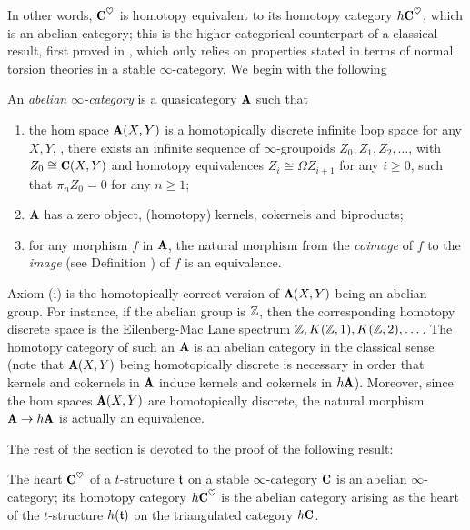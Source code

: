 \documentclass[a4paper,12pt]{amsart}
\renewcommand{\textbf}[1]{\text{\fontseries{b}\selectfont{\upshape #1}}}
\begin{document}
In other words, $\C^\heart$ is homotopy equivalent to its homotopy category $h\C^\heart$, which is an abelian category; this is the higher-categorical counterpart of a classical result, first proved in \cite[Thm. \textbf{1.3.6}]{BBDPervers}, 
which 
only relies on properties stated in terms of normal torsion theories in a stable $\infty$-category. We begin with the following
\begin{definition}\label{df:abelinfty}
An \emph{abelian $\infty$-category} is a quasicategory $\cate{A}$ such that
\begin{enumerate}
\item the hom space $\cate{A}(X,Y)$ is a homotopically discrete infinite loop space for any $X, Y$, \ie, there exists an infinite sequence of $\infty$-groupoids $Z_0, Z_1,Z_2,\dots$, with $Z_0\cong \C(X,Y)$ and homotopy equivalences $Z_i\cong \Omega Z_{i+1}$ for any $i\geq 0$, such that $\pi_n Z_0=0$ for any $n\geq 1$;
\item $\cate{A}$ has a zero object, (homotopy) kernels, cokernels and biproducts;
\item for any morphism $f$ in $\cate{A}$, the natural morphism from the \emph{coimage} of $f$ to the \emph{image} (see Definition ) of $f$ is an equivalence.
\end{enumerate}
\end{definition}
\begin{remark}
Axiom (i) is the homotopically-correct version of $\cate{A}(X,Y)$ being an abelian group. For instance, if the abelian group is $\mathbb{Z} $, then the corresponding homotopy discrete space is the Eilenberg-Mac Lane spectrum $\mathbb{Z} ,K(\mathbb{Z} ,1), K(\mathbb{Z} ,2),\dots$. The homotopy category of such an $\cate{A}$ is an abelian category in the classical sense (note that $\cate{A}(X,Y)$ being homotopically discrete is necessary in order that kernels and cokernels in $\cate{A}$ induce kernels and cokernels in $h\cate{A}$). Moreover, since the hom spaces $\cate{A}(X,Y)$ are homotopically discrete, the natural morphism $\cate{A}\to h\cate{A}$ is actually an equivalence.
\end{remark}
The rest of the section is devoted to the proof of the following result:
\begin{theorem}\label{heart.is.abelian}
The heart $\C^\heart$ of a $t$-structure $\mathfrak{t}$ on a stable $\infty$-category $\C$ is an abelian $\infty$-category; its homotopy category $h\C^\heart$ is the abelian category arising as the heart of the $t$-structure $h(\mathfrak{t})$ on the triangulated category $h\C$.
\end{theorem}
\end{document}
